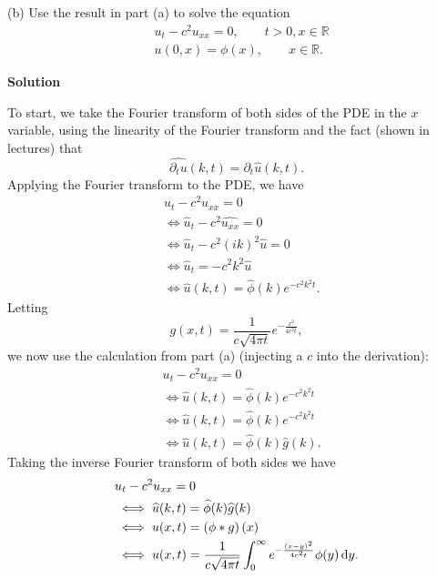 \documentclass{article}
\begin{document}
\vspace{5mm}

(b) Use the result in part (a) to solve the equation
%
\begin{align*}
    &u_t - c^2 u_{x x} = 0, \quad \quad t > 0, x \in \mathbb{R} \\
    &u(0, x) = \phi(x), \quad \quad x \in \mathbb{R}
    .
\end{align*}

\textbf{Solution}

To start, we take the Fourier transform of both sides of the PDE in the
$x$ variable, using the linearity of the Fourier transform and the fact
(shown in lectures) that
%
\begin{equation*}
    \widehat{\partial_t u}(k, t) = \partial_t \widehat{u} (k, t)
    .
\end{equation*}
%
Applying the Fourier transform to the PDE, we have
%
\begin{align*}
    &u_t - c^2 u_{x x} = 0 \\
    &\iff \widehat{u}_t - c^2 \widehat{u_{x x}} = 0 \\
    &\iff \widehat{u}_t - c^2 (i k)^2 \widehat{u} = 0 \\
    &\iff \widehat{u}_t = - c^2 k^2 \widehat{u} \\
    &\iff \widehat{u}(k, t) = \widehat{\phi}(k) e^{- c^2 k^2 t}
    .
\end{align*}
%
Letting
%
\begin{equation*}
    g(x, t) = \frac{1}{c \sqrt{4 \pi t}} e^{- \frac{x^2}{4 c^2 t}}
    ,
\end{equation*}
%
we now use the calculation from part (a) (injecting a $c$ into the
derivation):
%
\begin{align*}
    &u_t - c^2 u_{x x} = 0 \\
    &\iff \widehat{u}(k, t) = \widehat{\phi}(k) e^{- c^2 k^2 t} \\
    &\iff \widehat{u}(k, t) = \widehat{\phi}(k) e^{- c^2 k^2 t} \\
    &\iff \widehat{u}(k, t) = \widehat{\phi}(k) \widehat{g}(k)
    .
\end{align*}
%
Taking the inverse Fourier transform of both sides we have
%
\begin{align*}
    &u_t - c^2 u_{x x} = 0 \\
    &\iff \widehat{u}(k, t) = \widehat{\phi}(k) \widehat{g}(k) \\
    &\iff u(x, t) = \del{\phi * g}(x) \\
    &\iff u(x, t) = \frac{1}{c \sqrt{4 \pi t}} \int_0^\infty e^{- \frac{\del{x - y}^2}{4 c^2 t}} \phi(y) \dif y
    .
\end{align*}
\end{document}
